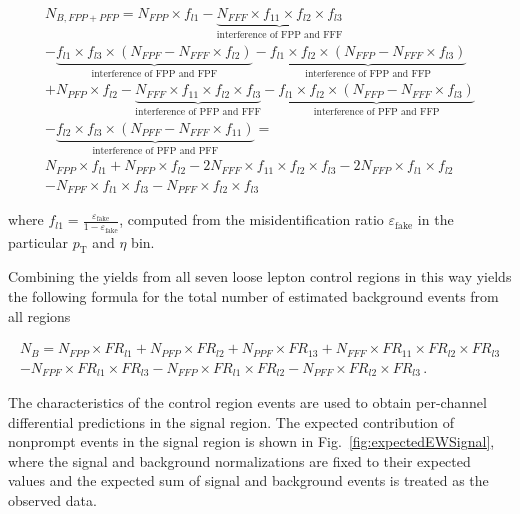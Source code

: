 \begin{multline*}
N_{B,FPP + PFP} = N_{FPP} \times f_{l1}
  - \underbrace{N_{FFF} \times f_{11} \times f_{l2} \times f_{l3}}_{\textrm{interference of FPP and FFF}} \\
  - \underbrace{f_{l1} \times f_{l3} \times (N_{FPF} - N_{FFF} \times f_{l2} )}_{\textrm{interference of FPP and FPF}}
- \underbrace{f_{l1} \times f_{l2} \times (N_{FFP} - N_{FFF} \times f_{l3})}_{\textrm{interference of FPP and FFP}}\\
 + N_{PFP} \times f_{l2} -  \underbrace{N_{FFF} \times f_{11} \times f_{l2} \times f_{l3}}_{\textrm{interference of PFP and FFF}}
 - \underbrace{f_{l1} \times f_{l2} \times (N_{FFP} - N_{FFF}  \times f_{l3})}_{\textrm{interference of PFP and FFP}}\\
  - \underbrace{f_{l2} \times f_{l3} \times (N_{PFF} -  N_{FFF} \times f_{11} )}_{\textrm{interference of PFP and PFF}} = \\
  N_{FPP} \times f_{l1} +  N_{PFP} \times f_{l2} - 2 N_{FFF} \times f_{11} \times f_{l2} \times f_{l3}
   - 2 N_{FFP} \times f_{l1} \times f_{l2} \\ - N_{FPF} \times f_{l1} \times f_{l3} -  N_{PFF} \times f_{l2} \times f_{l3}
\end{multline*}

where $f_{l1} = \frac{\varepsilon_{\text{fake}}}{1 - \varepsilon_{\text{fake}}}$, 
computed from the misidentification ratio $\varepsilon_{\text{fake}}$ in the 
particular $p_{\text{T}}$ and $\eta$ bin.

Combining the yields from all seven loose lepton control regions in this way yields the following formula
for the total number of estimated background events from all regions 

\begin{align*}
N_B = N_{FPP} \times FR_{l1} + N_{PFP} \times FR_{l2} + N_{PPF} \times FR_{13} 
 + N_{FFF} \times FR_{11} \times FR_{l2} \times FR_{l3}  \\
- N_{FPF} \times FR_{l1} \times FR_{l3} - N_{FFP} \times FR_{l1} \times FR_{l2} - N_{PFF} \times FR_{l2} \times FR_{l3} \,.
\label{eqn:fakerate}
\end{align*}

The characteristics of the control region events
are used to obtain per-channel differential predictions in the signal region.
The expected contribution of nonprompt events in the signal region is shown
in Fig.~\ref{fig:expectedEWSignal}, where the signal and background 
normalizations are fixed to their expected
values and the expected sum of signal and background events is treated as the 
observed data.

